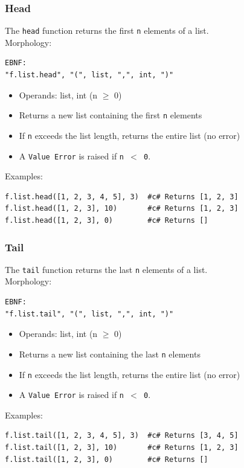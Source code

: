 \subsubsection{Head}
The \texttt{head} function returns the first \texttt{n} elements of a list.\\
Morphology:
\begin{verbatim}
EBNF:
"f.list.head", "(", list, ",", int, ")"
\end{verbatim}
\begin{itemize}
\item Operands: list, int (n $\geq$ 0)
\item Returns a new list containing the first \texttt{n} elements
\item If \texttt{n} exceeds the list length, returns the entire list (no error)
\item A \texttt{Value Error} is raised if \texttt{n $<$ 0}.
\end{itemize}
Examples:
\begin{verbatim}
f.list.head([1, 2, 3, 4, 5], 3)  #c# Returns [1, 2, 3]
f.list.head([1, 2, 3], 10)       #c# Returns [1, 2, 3]
f.list.head([1, 2, 3], 0)        #c# Returns []
\end{verbatim}

\subsubsection{Tail}
The \texttt{tail} function returns the last \texttt{n} elements of a list.\\
Morphology:
\begin{verbatim}
EBNF:
"f.list.tail", "(", list, ",", int, ")"
\end{verbatim}
\begin{itemize}
\item Operands: list, int (n $\geq$ 0)
\item Returns a new list containing the last \texttt{n} elements
\item If \texttt{n} exceeds the list length, returns the entire list (no error)
\item A \texttt{Value Error} is raised if \texttt{n $<$ 0}.
\end{itemize}
Examples:
\begin{verbatim}
f.list.tail([1, 2, 3, 4, 5], 3)  #c# Returns [3, 4, 5]
f.list.tail([1, 2, 3], 10)       #c# Returns [1, 2, 3]
f.list.tail([1, 2, 3], 0)        #c# Returns []
\end{verbatim}

